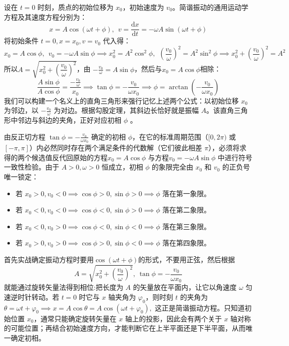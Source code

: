 \begin{theorem}[由初始条件确定简谐振动的振幅与初相]
    设在 $t = 0$ 时刻，质点的初始位移为 $x_0$，初始速度为 $v_0$。简谐振动的通用运动学方程及其速度方程分别为：$$x = A \cos(\omega t + \phi),~~v = \frac{\mathrm{d}x}{\mathrm{d}t} = -\omega A \sin(\omega t + \phi)$$将初始条件 $t = 0, x = x_0, v = v_0$ 代入得：$$x_0 = A \cos\phi ,~~v_0 = -\omega A \sin\phi \implies x_0^2 = A^2 \cos^2\phi,~~\left(\frac{v_0}{\omega}\right)^2 = A^2 \sin^2\phi\implies x_0^2 + \left(\frac{v_0}{\omega}\right)^2 = A^2$$所以$A = \sqrt{x_0^2 + \left(\dfrac{v_0}{\omega}\right)^2} $，由 $- \frac{v_0}{\omega} = A \sin\phi$，然后与$x_0 = A \cos\phi$相除：$$\frac{A \sin\phi}{A \cos\phi} = \frac{-\frac{v_0}{\omega}}{x_0} \implies \tan\phi = -\frac{v_0}{\omega x_0}\implies\boxed{\phi = \arctan\left(-\frac{v_0}{\omega x_0}\right)} $$我们可以构建一个名义上的直角三角形来强行记忆上述两个公式：以初始位移 $x_0$ 为邻边，以 $-\frac{v_0}{\omega}$ 为对边。根据勾股定理，其斜边长恰好就是振幅 $A$。该直角三角形中邻边与斜边的夹角，正好对应初相 $\phi$ 。
    
    由反正切方程 $\tan\phi = -\frac{v_0}{\omega x_0}$ 确定的初相 $\phi$，在它的标准周期范围（$[0, 2\pi)$ 或 $[-\pi, \pi]$）内必然同时存在两个满足条件的代数解（它们彼此相差 $\pi$），必须将求得的两个候选值反代回原始的方程$x_0 = A \cos\phi$ 与方程$v_0 = -\omega A \sin\phi$ 中进行符号一致性检验。由于 $A > 0, \omega > 0$ 恒成立，初相 $\phi$ 的象限完全由 $x_0$ 和 $v_0$ 的正负号唯一锁定：
    \begin{itemize}
    \item 若 $x_0 > 0, v_0 < 0 \implies \cos\phi > 0, \sin\phi > 0 \implies \phi$ 落在第一象限。
    \item 若 $x_0 < 0, v_0 < 0 \implies \cos\phi < 0, \sin\phi > 0 \implies \phi$ 落在第二象限。
    \item 若 $x_0 < 0, v_0 > 0 \implies \cos\phi < 0, \sin\phi < 0 \implies \phi$ 落在第三象限。
    \item 若 $x_0 > 0, v_0 > 0 \implies \cos\phi > 0, \sin\phi < 0 \implies \phi$ 落在第四象限。
    \end{itemize}
\end{theorem}

\begin{definition}[旋转矢量法]
首先实战确定振动方程时要用$\cos(\omega t+\phi)$的形式，不要用正弦，然后根据\[A = \sqrt{x_0^2 + \left(\dfrac{v_0}{\omega}\right)^2},~\tan\phi = -\frac{v_0}{\omega x_0}\]就能通过旋转矢量法得到相位:把长度为 \(A\) 的矢量放在平面内，让它以角速度 \(\omega\) 匀速逆时针转动。若 \(t=0\) 时它与 \(x\) 轴夹角为 \(\varphi_0\)，则时刻 \(t\) 的夹角为
 \(\theta=\omega t+\varphi_0 \implies x=A\cos\theta=A\cos(\omega t+\varphi_0),\) 
这正是简谐振动方程。只知道初始位置 \(x_0\)，通常只能确定旋转矢量在 \(x\) 轴上的投影，因此会有两个关于 \(x\) 轴对称的可能位置；再结合初始速度方向，才能判断它在上半平面还是下半平面，从而唯一确定初相。
\end{definition}

